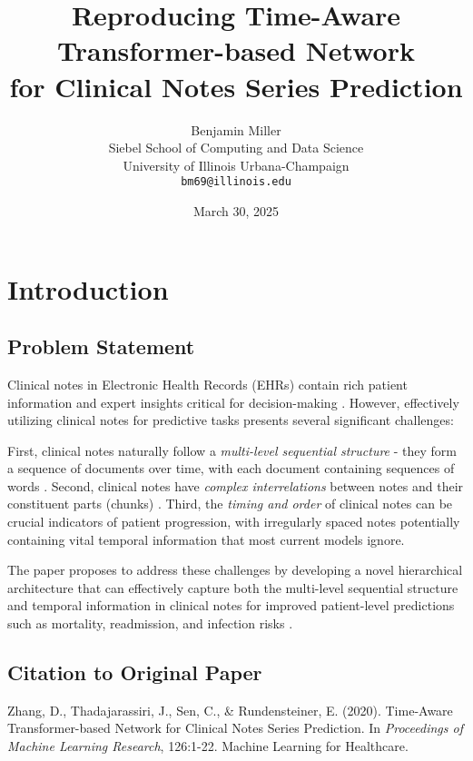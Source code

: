 \documentclass[10pt,letterpaper,twocolumn]{article}
\title{\textbf{Reproducing Time-Aware Transformer-based Network\\for Clinical Notes Series Prediction}}
\author{Benjamin Miller \\
Siebel School of Computing and Data Science \\
University of Illinois Urbana-Champaign \\
\texttt{bm69@illinois.edu}}
\date{March 30, 2025}
\begin{document}
\twocolumn[
  \begin{@twocolumnfalse}
	\vspace{-0.5in}
    \maketitle
    \thispagestyle{empty}
  \end{@twocolumnfalse}
]

\section{Introduction}

\subsection{Problem Statement}
Clinical notes in Electronic Health Records (EHRs) contain rich patient information and expert insights critical for decision-making \cite{johnson2016mimic}. However, effectively utilizing clinical notes for predictive tasks presents several significant challenges:

First, clinical notes naturally follow a \textit{multi-level sequential structure} - they form a sequence of documents over time, with each document containing sequences of words \cite{sen2019patient}. Second, clinical notes have \textit{complex interrelations} between notes and their constituent parts (chunks) \cite{huang2019clinicalbert}. Third, the \textit{timing and order} of clinical notes can be crucial indicators of patient progression, with irregularly spaced notes potentially containing vital temporal information that most current models ignore.

The paper proposes to address these challenges by developing a novel hierarchical architecture that can effectively capture both the multi-level sequential structure and temporal information in clinical notes for improved patient-level predictions such as mortality, readmission, and infection risks \cite{zhang2020time}.

\subsection{Citation to Original Paper}
Zhang, D., Thadajarassiri, J., Sen, C., \& Rundensteiner, E. (2020). Time-Aware Transformer-based Network for Clinical Notes Series Prediction\cite{zhang2020time}. In \textit{Proceedings of Machine Learning Research}, 126:1-22. Machine Learning for Healthcare.
\end{document}
